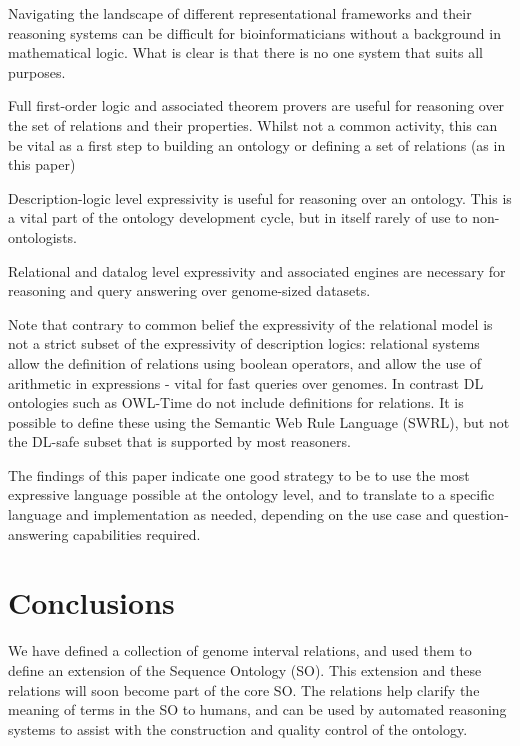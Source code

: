 \documentclass{article}
\begin{document}
Navigating the landscape of different representational frameworks and
their reasoning systems can be difficult for bioinformaticians without
a background in mathematical logic. What is clear is that there is no
one system that suits all purposes. 

\begin{clist}

\item Full first-order logic and associated theorem provers are useful
  for reasoning over the set of relations and their properties. Whilst
  not a common activity, this can be vital as a first step to building
  an ontology or defining a set of relations (as in this paper)

\item Description-logic level expressivity is useful for reasoning
  over an ontology. This is a vital part of the ontology development
  cycle, but in itself rarely of use to non-ontologists.

\item Relational and datalog level expressivity and associated engines
  are necessary for reasoning and query answering over genome-sized
  datasets.

\end{clist}

Note that contrary to common belief the expressivity of the relational
model is not a strict subset of the expressivity of description
logics: relational systems allow the definition of relations using
boolean operators, and allow the use of arithmetic in expressions -
vital for fast queries over genomes. In contrast DL ontologies such as
OWL-Time\cite{OWLTime} do not include definitions for relations. It is
possible to define these using the Semantic Web Rule Language (SWRL),
but not the DL-safe subset that is supported by most reasoners.

The findings of this paper indicate one good strategy to be to use the
most expressive language possible at the ontology level, and to
translate to a specific language and implementation as needed,
depending on the use case and question-answering capabilities required.

\section{Conclusions}

We have defined a collection of genome interval relations, and used
them to define an extension of the Sequence Ontology (SO). This
extension and these relations will soon become part of the core
SO. The relations help clarify the meaning of terms in the SO to
humans, and can be used by automated reasoning systems to assist with
the construction and quality control of the ontology.
\end{document}
